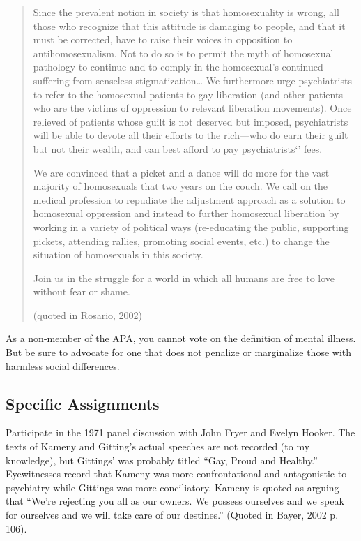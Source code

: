 \begin{refsection}
\begin{quote}
Since the prevalent notion in society is that homosexuality is wrong, all those who recognize that this attitude is damaging to people, and that it must be corrected, have to raise their voices in opposition to antihomosexualism. Not to do so is to permit the myth of homosexual pathology to continue and to comply in the homosexual's continued suffering from senseless stigmatization{\ldots} We furthermore urge psychiatrists to refer to the homosexual patients to gay liberation (and other patients who are the victims of oppression to relevant liberation movements). Once relieved of patients whose guilt is not deserved but imposed, psychiatrists will be able to devote all their efforts to the rich---who do earn their guilt but not their wealth, and can best afford to pay psychiatrists`' fees.

We are convinced that a picket and a dance will do more for the vast majority of homosexuals that two years on the couch. We call on the medical profession to repudiate the adjustment approach as a solution to homosexual oppression and instead to further homosexual liberation by working in a variety of political ways (re-educating the public, supporting pickets, attending rallies, promoting social events, etc.) to change the situation of homosexuals in this society.

Join us in the struggle for a world in which all humans are free to love without fear or shame.

(quoted in Rosario, 2002)
\end{quote}

As a non-member of the APA, you cannot vote on the definition of mental illness. But be sure to advocate for one that does not penalize or marginalize those with harmless social differences.

\subsection{Specific Assignments}
\label{specificassignments}

Participate in the 1971 panel discussion with John Fryer and Evelyn Hooker. The texts of Kameny and Gitting's actual speeches are not recorded (to my knowledge), but Gittings' was probably titled ``Gay, Proud and Healthy.'' Eyewitnesses record that Kameny was more confrontational and antagonistic to psychiatry while Gittings was more conciliatory. Kameny is quoted as arguing that ``We're rejecting you all as our owners. We possess ourselves and we speak for ourselves and we will take care of our destines.'' (Quoted in Bayer, 2002 p. 106).


\end{refsection}
